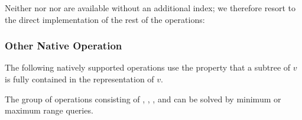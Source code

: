 \begin{algorithmic}
	\State {}
\EndFunction
\end{algorithmic}

Neither \degree{} nor \childRank{} nor \childSelect{} are available without an additional index; we therefore resort to the direct implementation of the rest of the \childAny{} operations:

\begin{algorithmic}
	\State {}
\EndFunction
\end{algorithmic}

\begin{algorithmic}
	\State {}
\EndFunction
\end{algorithmic}

\begin{algorithmic}
	\State {}
\EndFunction
\end{algorithmic}

\begin{algorithmic}
	\State {}
\EndFunction
\end{algorithmic}

\subsubsection{Other Native Operation}

The following natively supported operations use the property that a subtree of $v$ is fully contained in the representation of $v$.

\begin{algorithmic}
	\State {}
\EndFunction
\end{algorithmic}

\begin{algorithmic}
	\State {}
\EndFunction
\end{algorithmic}

\begin{algorithmic}
	\State {}
\EndFunction
\end{algorithmic}

The group of operations consisting of \lca, \distance, \deepestVertex, and \hei can be solved by minimum or maximum range queries.

